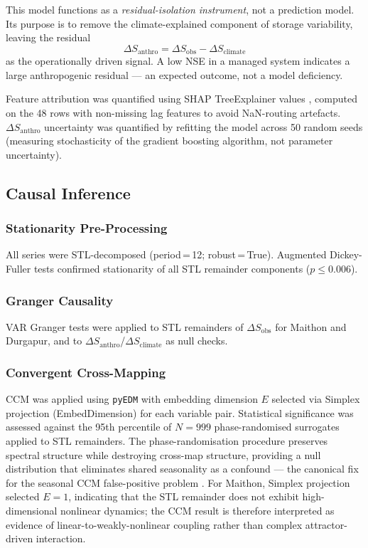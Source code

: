 \documentclass[preprint,12pt,authoryear]{elsarticle}
\newcommand{\dSobs}{\Delta S_{\mathrm{obs}}}
\newcommand{\dSclim}{\Delta S_{\mathrm{climate}}}
\newcommand{\dSanthro}{\Delta S_{\mathrm{anthro}}}
\begin{document}
This model functions as a \textit{residual-isolation instrument}, not a
prediction model. Its purpose is to remove the climate-explained component
of storage variability, leaving the residual
\begin{equation}
  \dSanthro = \dSobs - \dSclim
  \label{eq:residual}
\end{equation}
as the operationally driven signal. A low NSE in a managed system indicates a
large anthropogenic residual --- an expected outcome, not a model deficiency.

Feature attribution was quantified using SHAP TreeExplainer values
\citep{Lundberg2017}, computed on the 48 rows with non-missing lag features
to avoid NaN-routing artefacts. $\dSanthro$ uncertainty was quantified by
refitting the model across 50 random seeds (measuring stochasticity
of the gradient boosting algorithm, not parameter uncertainty).

\subsection{Causal Inference}
\label{sec:methods_causal}

\subsubsection{Stationarity Pre-Processing}

All series were STL-decomposed \citep{Cleveland1990} (period\,=\,12; robust\,=\,True).
Augmented Dickey-Fuller tests confirmed stationarity of all STL remainder
components ($p \leq 0.006$).

\subsubsection{Granger Causality}

VAR Granger tests were applied to STL remainders of $\dSobs$ for Maithon and
Durgapur, and to $\dSanthro$/$\dSclim$ as null checks.

\subsubsection{Convergent Cross-Mapping}

CCM \citep{Sugihara2012} was applied using \texttt{pyEDM} with embedding
dimension $E$ selected via Simplex projection (EmbedDimension) for each
variable pair. Statistical significance was assessed against the 95th
percentile of $N = 999$ phase-randomised surrogates \citep{Theiler1992}
applied to STL remainders. The phase-randomisation procedure preserves
spectral structure while destroying cross-map structure, providing a null
distribution that eliminates shared seasonality as a confound --- the canonical
fix for the seasonal CCM false-positive problem \citep{Theiler1992,Sugihara2012}.
For Maithon, Simplex projection selected $E = 1$, indicating that the STL
remainder does not exhibit high-dimensional nonlinear dynamics; the CCM result
is therefore interpreted as evidence of linear-to-weakly-nonlinear coupling
rather than complex attractor-driven interaction.
\end{document}
